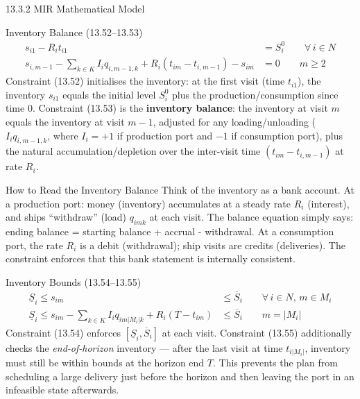 \documentclass[aspectratio=169,10pt]{beamer}
\begin{document}
\begin{frame}[allowframebreaks]{13.3.2 MIR Mathematical Model}
  \begin{block}{Inventory Balance (13.52--13.53)}
    \begin{align}
      s_{i1} - R_i t_{i1} &= S_i^0
      \qquad \forall\, i \in N
      \tag{13.52} \\
      s_{i,m-1} - \sum_{k \in K} I_i q_{i,m-1,k}
      + R_i (t_{im} - t_{i,m-1}) - s_{im} &= 0
      \qquad m \geq 2
      \tag{13.53}
    \end{align}
    Constraint (13.52) initialises the inventory: at the first visit
    (time $t_{i1}$), the inventory $s_{i1}$ equals the initial level $S_i^0$
    plus the production/consumption since time 0.  Constraint (13.53) is the
    \textbf{inventory balance}: the inventory at visit $m$ equals the inventory
    at visit $m{-}1$, adjusted for any loading/unloading ($I_i q_{i,m-1,k}$,
    where $I_i = +1$ if production port and $-1$ if consumption port),
    plus the natural accumulation/depletion over the inter-visit time
    $(t_{im} - t_{i,m-1})$ at rate $R_i$.
  \end{block}

  \begin{alertblock}{How to Read the Inventory Balance}
    Think of the inventory as a bank account.  At a production port: money
    (inventory) accumulates at a steady rate $R_i$ (interest), and ships
    ``withdraw'' (load) $q_{imk}$ at each visit.  The balance equation simply
    says: ending balance = starting balance + accrual - withdrawal.  At a
    consumption port, the rate $R_i$ is a debit (withdrawal); ship visits
    are credits (deliveries).  The constraint enforces that this bank
    statement is internally consistent.
  \end{alertblock}

  \begin{block}{Inventory Bounds (13.54--13.55)}
    \begin{align}
      \underline{S}_i \leq s_{im} &\leq \overline{S}_i
      \qquad \forall\, i \in N,\, m \in M_i
      \tag{13.54} \\
      \underline{S}_i \leq s_{im} - \sum_{k \in K} I_i q_{im|M_i|k}
      + R_i(T - t_{im}) &\leq \overline{S}_i
      \qquad m = |M_i|
      \tag{13.55}
    \end{align}
    Constraint (13.54) enforces $[\underline{S}_i, \overline{S}_i]$ at each
    visit.  Constraint (13.55) additionally checks the \emph{end-of-horizon}
    inventory --- after the last visit at time $t_{i|M_i|}$, inventory must
    still be within bounds at the horizon end $T$.  This prevents the plan
    from scheduling a large delivery just before the horizon and then leaving
    the port in an infeasible state afterwards.
  \end{block}


\end{frame}
\end{document}
